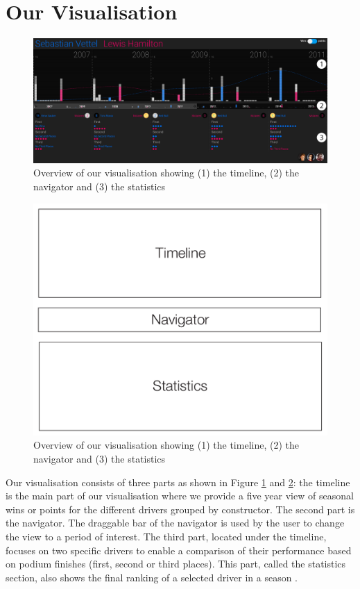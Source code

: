 \documentclass{sigchi}
\begin{document}
\section{Our Visualisation}
\begin{figure}[tp]
  \centering
  \includegraphics[width=1\textwidth]{images/overview.png}
  \caption{Overview of our visualisation showing (1) the timeline, (2) the navigator and (3) the statistics}
  \label{fig:overview}
\end{figure}

\begin{figure}[ht]
  \centering
  \includegraphics[width=0.75\columnwidth]{images/layout.pdf}
  \caption{Overview of our visualisation showing (1) the timeline, (2) the navigator and (3) the statistics}
  \label{fig:layout}
\end{figure}
Our visualisation consists of three parts as shown in Figure \ref{fig:overview} and \ref{fig:layout}: the timeline is the main part of our visualisation where we provide a five year view of seasonal wins or points for the different drivers grouped by constructor. The second part is the navigator. The draggable bar of the navigator is used by the user to change the view to a period of interest. The third part, located under the timeline, focuses on two specific drivers to enable a comparison of their performance based on podium finishes (first, second or third places). This part, called the statistics section, also shows the final ranking of a selected driver in a season . 
\end{document}
